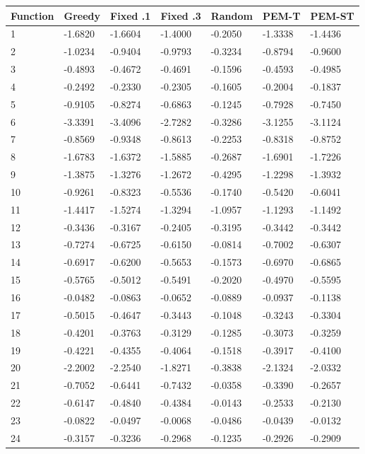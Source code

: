 \documentclass[11pt,a4paper]{article}
\begin{document}
\par\noindent\begin{minipage}{\linewidth}

\begin{longtable}[]{@{}lllllll@{}}
\toprule
Function & Greedy & Fixed .1 & Fixed .3 & Random & PEM-T & PEM-ST \\
\midrule
\endhead
1 & -1.6820 & -1.6604 & -1.4000 & -0.2050 & -1.3338 & -1.4436 \\
2 & -1.0234 & -0.9404 & -0.9793 & -0.3234 & -0.8794 & -0.9600 \\
3 & -0.4893 & -0.4672 & -0.4691 & -0.1596 & -0.4593 & -0.4985 \\
4 & -0.2492 & -0.2330 & -0.2305 & -0.1605 & -0.2004 & -0.1837 \\
5 & -0.9105 & -0.8274 & -0.6863 & -0.1245 & -0.7928 & -0.7450 \\
6 & -3.3391 & -3.4096 & -2.7282 & -0.3286 & -3.1255 & -3.1124 \\
7 & -0.8569 & -0.9348 & -0.8613 & -0.2253 & -0.8318 & -0.8752 \\
8 & -1.6783 & -1.6372 & -1.5885 & -0.2687 & -1.6901 & -1.7226 \\
9 & -1.3875 & -1.3276 & -1.2672 & -0.4295 & -1.2298 & -1.3932 \\
10 & -0.9261 & -0.8323 & -0.5536 & -0.1740 & -0.5420 & -0.6041 \\
11 & -1.4417 & -1.5274 & -1.3294 & -1.0957 & -1.1293 & -1.1492 \\
12 & -0.3436 & -0.3167 & -0.2405 & -0.3195 & -0.3442 & -0.3442 \\
13 & -0.7274 & -0.6725 & -0.6150 & -0.0814 & -0.7002 & -0.6307 \\
14 & -0.6917 & -0.6200 & -0.5653 & -0.1573 & -0.6970 & -0.6865 \\
15 & -0.5765 & -0.5012 & -0.5491 & -0.2020 & -0.4970 & -0.5595 \\
16 & -0.0482 & -0.0863 & -0.0652 & -0.0889 & -0.0937 & -0.1138 \\
17 & -0.5015 & -0.4647 & -0.3443 & -0.1048 & -0.3243 & -0.3304 \\
18 & -0.4201 & -0.3763 & -0.3129 & -0.1285 & -0.3073 & -0.3259 \\
19 & -0.4221 & -0.4355 & -0.4064 & -0.1518 & -0.3917 & -0.4100 \\
20 & -2.2002 & -2.2540 & -1.8271 & -0.3838 & -2.1324 & -2.0332 \\
21 & -0.7052 & -0.6441 & -0.7432 & -0.0358 & -0.3390 & -0.2657 \\
22 & -0.6147 & -0.4840 & -0.4384 & -0.0143 & -0.2533 & -0.2130 \\
23 & -0.0822 & -0.0497 & -0.0068 & -0.0486 & -0.0439 & -0.0132 \\
24 & -0.3157 & -0.3236 & -0.2968 & -0.1235 & -0.2926 & -0.2909 \\
\bottomrule
\end{longtable}

\end{minipage}\par
\end{document}
